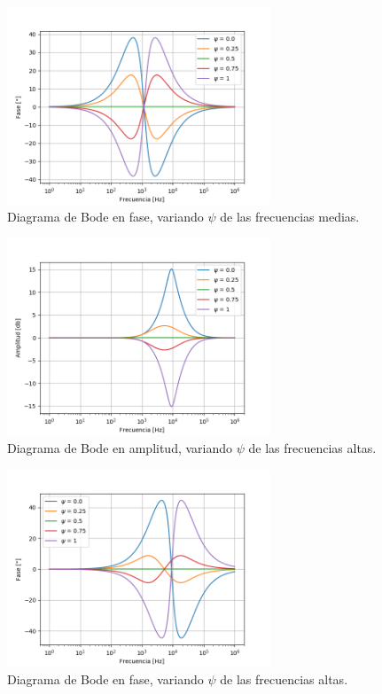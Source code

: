 \begin{figure}[H]
\centering
	\includegraphics[width=0.7\textwidth]{Imagenes/Medium-psi-ph.png}
	\caption{Diagrama de Bode en fase, variando $\psi$ de las frecuencias medias.}
	\label{fig:bode_ph_med}
\end{figure}
\begin{figure}[H]
\centering
	\includegraphics[width=0.7\textwidth]{Imagenes/High-psi-bode.png}
	\caption{Diagrama de Bode en amplitud, variando $\psi$ de las frecuencias altas.}
	\label{fig:bode_modulo_high}
\end{figure}
\begin{figure}[H]
\centering
	\includegraphics[width=0.7\textwidth]{Imagenes/High-psi-ph.png}
	\caption{Diagrama de Bode en fase, variando $\psi$ de las frecuencias altas.}
	\label{fig:bode_ph_high}
\end{figure}

